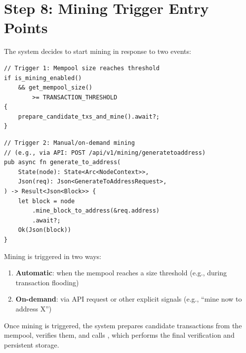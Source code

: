 \section{Step 8: Mining Trigger Entry Points}
\label{sec:ch09-5-step8}

The system decides to start mining in response to two events:

\begin{listing}[htbp]
\caption{Mining trigger 1: mempool threshold}
\label{lst:ch09-5-9}
\begin{verbatim}
// Trigger 1: Mempool size reaches threshold
if is_mining_enabled()
    && get_mempool_size()
        >= TRANSACTION_THRESHOLD
{
    prepare_candidate_txs_and_mine().await?;
}
\end{verbatim}
\end{listing}

\begin{listing}[htbp]
\caption{Mining trigger 2: on-demand mining (manual trigger)}
\label{lst:ch09-5-10}
\begin{verbatim}
// Trigger 2: Manual/on-demand mining
// (e.g., via API: POST /api/v1/mining/generatetoaddress)
pub async fn generate_to_address(
    State(node): State<Arc<NodeContext>>,
    Json(req): Json<GenerateToAddressRequest>,
) -> Result<Json<Block>> {
    let block = node
        .mine_block_to_address(&req.address)
        .await?;
    Ok(Json(block))
}
\end{verbatim}
\end{listing}

\begin{notebox}
Mining is triggered in two ways:
\begin{enumerate}
  \item \textbf{Automatic}: when the mempool reaches a size threshold (e.g., during transaction flooding)
  \item \textbf{On-demand}: via API request or other explicit signals (e.g., ``mine now to address X'')
\end{enumerate}

Once mining is triggered, the system prepares candidate transactions from the mempool, verifies them, and calls , which performs the final verification and persistent storage.
\end{notebox}

